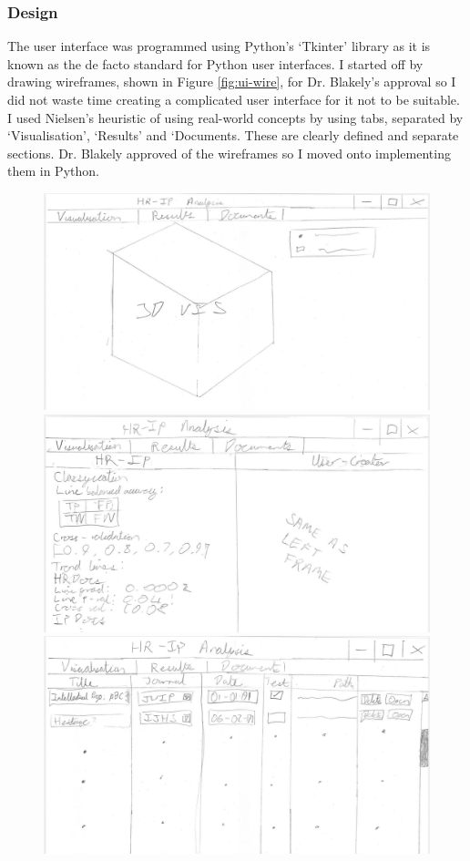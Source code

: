 			\subsubsection{Design}
				The user interface was programmed using Python's `Tkinter' library as it is known as the de facto standard for Python user interfaces. I started off by drawing wireframes, shown in Figure \ref{fig:ui-wire}, for Dr. Blakely's approval so I did not waste time creating a complicated user interface for it not to be suitable. I used Nielsen's heuristic of using real-world concepts by using tabs, separated by `Visualisation', `Results' and `Documents. These are clearly defined and separate sections. Dr. Blakely approved of the wireframes so I moved onto implementing them in Python.
				\begin{figure}
  						\includegraphics[width=\linewidth]{resources/images/ui_wire_3d.png}
  					\endminipage\hfill
  						\includegraphics[width=\linewidth]{resources/images/ui_wire_eval.png}
  					\endminipage\hfill
  						\includegraphics[width=\linewidth]{resources/images/ui_wire_documents.png}

\end{figure}
